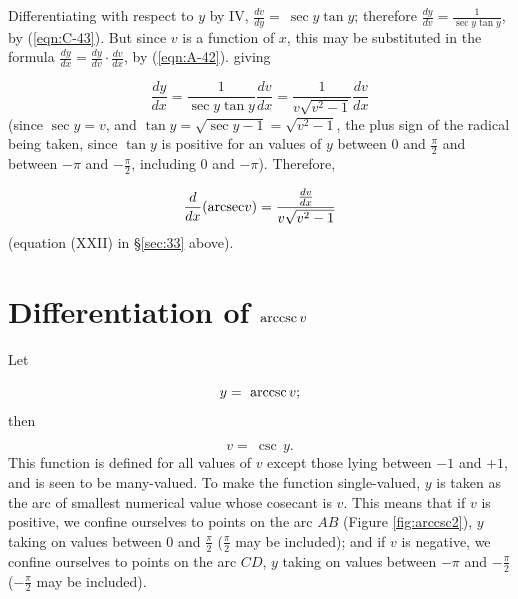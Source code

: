Differentiating with respect to $y$ by IV,
$\frac{dv}{dy} 	=\ \sec y \tan y$;
therefore $\frac{dy}{dv} 	= \frac{1}{\sec y \tan y}$, by (\ref{eqn:C-43}). %
But since $v$ is a function of $x$, this may be substituted in the formula
$\frac{dy}{dx} 	= \frac{dy}{dv} \cdot \frac{dv}{dx}$, by (\ref{eqn:A-42}).%
giving 	

\[
\frac{dy}{dx} 	= \frac{1}{\sec y \tan y} \frac{dv}{dx}
  	= \frac{1}{v \sqrt{v^2 - 1}} \frac{dv}{dx}
\]
(since $\sec y = v$, and $\tan y = \sqrt{\sec y - 1} = \sqrt{v^2 - 1}$, the plus sign 
of the radical being taken, since $\tan y$ is positive for an values of $y$ between 
$0$ and $\frac{\pi}{2}$ and between $-\pi$ and $-\frac{\pi}{2}$, including 
$0$ and $-\pi$). Therefore,

\[
\frac{d}{dx} ({\rm arcsec} v) 	= \frac{\frac{dv}{dx}}{v \sqrt{v^2 - 1}}
\]
(equation (XXII) in \S \ref{sec:33}  above).

\section{Differentiation of ${\rm arccsc}\, v$}

Let 

\[
y 	=\ {\rm arccsc}\, v; 
\]
then 

\[
v =\ \csc\, y.
\]
This function is defined for all values of $v$ except those lying between $-1$ and $+1$, 
and is seen to be many-valued. To make the function single-valued, $y$ is taken as the 
arc of smallest numerical value whose cosecant is $v$. This means that if $v$ is positive, 
we confine ourselves to points on the arc $AB$ (Figure \ref{fig:arccsc2}), $y$ taking 
on values between $0$ and $\frac{\pi}{2}$ ($\frac{\pi}{2}$ may be included); 
and if $v$ is negative, we confine ourselves to points on the arc $CD$, $y$ taking on 
values between $-\pi$ and $-\frac{\pi}{2}$ ($-\frac{\pi}{2}$ may be included). 

%

